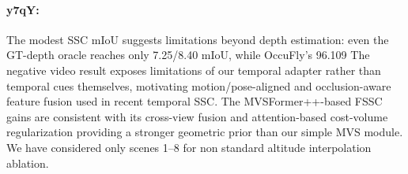 \documentclass[10pt,twocolumn,letterpaper]{article}
\begin{document}
\paragraph{y7qY:}
The modest SSC mIoU suggests limitations beyond depth estimation: even the GT-depth oracle reaches only 7.25/8.40 mIoU, while OccuFly’s 96.109%
The negative video result exposes limitations of our temporal adapter rather than temporal cues themselves, motivating motion/pose-aligned and occlusion-aware feature fusion used in recent temporal SSC.
The MVSFormer++-based FSSC gains are consistent with its cross-view fusion and attention-based cost-volume regularization providing a stronger geometric prior than our simple MVS module.
We have considered only scenes 1--8 for non standard  altitude interpolation ablation. 
\end{document}
